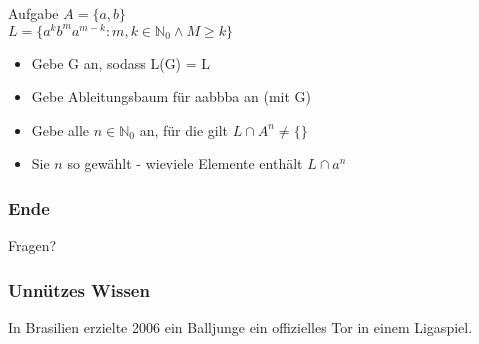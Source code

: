 \documentclass{beamer}
\begin{document}
\begin{frame}
	\begin{block}{Aufgabe}
		$ A = \{a,b\}$\\
		$ L = \{a^kb^ma^{m-k} : m,k \in \mathbb{N}_0 \land M \ge k\} $
		\begin{itemize}
			\item Gebe G an, sodass L(G) = L
			\item Gebe Ableitungsbaum für aabbba an (mit G)
			\item Gebe alle $n \in \mathbb{N}_0$ an, für die gilt $L \cap A^n \not= \{\}$
			\item Sie $n$ so gewählt - wieviele Elemente enthält  $L \cap a^n$
		\end{itemize}
	\end{block}
\end{frame}

\begin {frame}
\frametitle {Ende}
	\begin {center}
	Fragen?
	\end {center}
\end {frame}

\begin{frame}
	\frametitle{Unnützes Wissen}
	\begin{center}
		In Brasilien erzielte 2006 ein Balljunge ein offizielles Tor in einem Ligaspiel.
	\end{center}
\end{frame}
\end{document}
